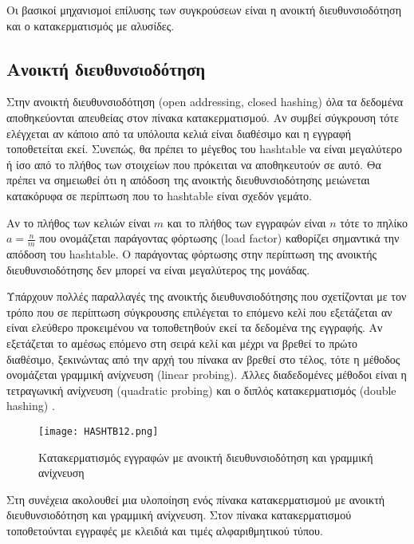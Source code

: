 Οι βασικοί μηχανισμοί επίλυσης των συγκρούσεων είναι η ανοικτή διευθυνσιοδότηση και ο κατακερματισμός με αλυσίδες.

\subsection{Ανοικτή διευθυνσιοδότηση}
Στην ανοικτή διευθυνσιοδότηση (open addressing, closed hashing) όλα τα δεδομένα αποθηκεύονται απευθείας στον πίνακα κατακερματισμού. Αν συμβεί σύγκρουση τότε ελέγχεται αν κάποιο από τα υπόλοιπα κελιά είναι διαθέσιμο και η εγγραφή τοποθετείται εκεί. Συνεπώς, θα πρέπει το μέγεθος του hashtable να είναι μεγαλύτερο ή ίσο από το πλήθος των στοιχείων που πρόκειται να αποθηκευτούν σε αυτό. Θα πρέπει να σημειωθεί ότι η απόδοση της ανοικτής διευθυνσιοδότησης μειώνεται κατακόρυφα σε περίπτωση που το hashtable είναι σχεδόν γεμάτο. 

Αν το πλήθος των κελιών είναι $m$ και το πλήθος των εγγραφών είναι $n$ τότε το πηλίκο $a=\frac{n}{m}$ που ονομάζεται παράγοντας φόρτωσης (load factor) καθορίζει σημαντικά την απόδοση του hashtable. Ο παράγοντας φόρτωσης στην περίπτωση της ανοικτής διευθυνσιοδότησης δεν μπορεί να είναι μεγαλύτερος της μονάδας.

Υπάρχουν πολλές παραλλαγές της ανοικτής διευθυνσιοδότησης που σχετίζονται με τον τρόπο που σε περίπτωση σύγκρουσης επιλέγεται το επόμενο κελί που εξετάζεται αν είναι ελεύθερο προκειμένου να τοποθετηθούν εκεί τα δεδομένα της εγγραφής. Αν εξετάζεται το αμέσως επόμενο στη σειρά κελί και μέχρι να βρεθεί το πρώτο διαθέσιμο, ξεκινώντας από την αρχή του πίνακα αν βρεθεί στο τέλος, τότε η μέθοδος ονομάζεται γραμμική ανίχνευση (linear probing). Άλλες διαδεδομένες μέθοδοι είναι η τετραγωνική ανίχνευση (quadratic probing) και ο διπλός κατακερματισμός (double hashing) \cite{visualalgo_hashtables}.

\begin{figure}[ht]
\centering
\texttt{[image: HASHTB12.png]}
\caption{Κατακερματισμός εγγραφών με ανοικτή διευθυνσιοδότηση και γραμμική ανίχνευση \cite{wiki_hashtables}}
\label{fig:hashtable2}
\end{figure}

Στη συνέχεια ακολουθεί μια υλοποίηση ενός πίνακα κατακερματισμού με ανοικτή διευθυνσιοδότηση και γραμμική ανίχνευση. Στον πίνακα κατακερματισμού τοποθετούνται εγγραφές με κλειδιά και τιμές αλφαριθμητικού τύπου. 



